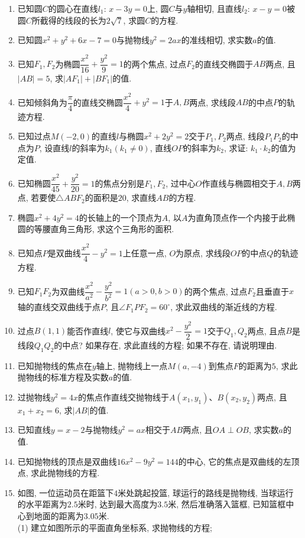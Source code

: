 \documentclass[10pt,a4paper]{article}
\begin{document}
\begin{enumerate}[1.]
\item 已知圆$C$的圆心在直线$l_1$: $x-3y=0$上, 圆$C$与$y$轴相切, 且直线$l_2$: $x-y=0$被圆$C$所截得的线段的长为$2\sqrt 7$, 求圆$C$的方程.
\item 已知圆$x^2+y^2+6x-7=0$与抛物线$y^2=2ax$的准线相切, 求实数$a$的值.
\item 已知$F_1,F_2$为椭圆$\dfrac{x^2}{16}+\dfrac{y^2}9=1$的两个焦点, 过点$F_2$的直线交椭圆于$AB$两点, 且$|AB|=5$, 求$|AF_1|+|BF_1|$的值.
\item 已知倾斜角为$\dfrac{\pi }4$的直线交椭圆$\dfrac{x^2}4+y^2=1$于$A,B$两点, 求线段$AB$的中点$P$的轨迹方程.
\item 已知过点$M(-2,0)$的直线$l$与椭圆$x^2+2y^2=2$交于$P_1,P_2$两点, 线段$P_1P_2$的中点为$P$, 设直线$l$的斜率为$k_1(k_1\ne 0)$, 直线$OP$的斜率为$k_2$, 求证: $k_1\cdot k_2$的值为定值.
\item 已知椭圆$\dfrac{x^2}{45}+\dfrac{y^2}{20}=1$的焦点分别是$F_1,F_2$, 过中心$O$作直线与椭圆相交于$A,B$两点, 若要使$\triangle ABF_2$的面积是$20$, 求直线$AB$的方程.
\item 椭圆$x^2+4y^2=4$的长轴上的一个顶点为$A$, 以$A$为直角顶点作一个内接于此椭圆的等腰直角三角形, 求这个三角形的面积.
\item 已知点$P$是双曲线$\dfrac{x^2}4-y^2=1$上任意一点, $O$为原点, 求线段$OP$的中点$Q$的轨迹方程.
\item 已知$F_1F_2$为双曲线$\dfrac{x^2}{a^2}-\dfrac{y^2}{b^2}=1(a>0,b>0)$的两个焦点, 过点$F_2$且垂直于$x$轴的直线交双曲线于点$P$, 且$\angle F_1PF_2=60^{\circ }$, 求此双曲线的渐近线的方程.
\item 过点$B(1,1)$能否作直线$l$, 使它与双曲线$x^2-\dfrac{y^2}2=1$交于$Q_1,Q_2$两点, 且点$B$是线段$Q_1Q_2$的中点? 如果存在, 求此直线的方程; 如果不存在, 请说明理由.
\item 已知抛物线的焦点在$y$轴上, 抛物线上一点$M(a,-4)$到焦点$F$的距离为$5$, 求此抛物线的标准方程及实数$a$的值.
\item 过抛物线$y^2=4x$的焦点作直线交抛物线于$A(x_1,y_1)$、$B(x_2,y_2)$两点, 且$x_1+x_2=6$, 求$|AB|$的值.
\item 已知直线$y=x-2$与抛物线$y^2=ax$相交于$AB$两点, 且$OA\perp OB$, 求实数$a$的值.
\item 已知抛物线的顶点是双曲线$16x^2-9y^2=144$的中心, 它的焦点是双曲线的左顶点, 求此抛物线的方程.
\item 如图, 一位运动员在距篮下$4$米处跳起投篮, 球运行的路线是抛物线, 当球运行的水平距离为$2.5$米时, 达到最大高度为$3.5$米, 然后准确落入篮框, 已知篮框中心到地面的距离为$3.05$米.\\
(1) 建立如图所示的平面直角坐标系, 求抛物线的方程;\\

\end{enumerate}
\end{document}
